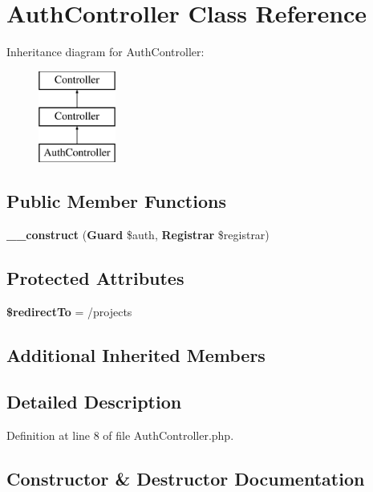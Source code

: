 \section{Auth\+Controller Class Reference}
\label{class_app_1_1_http_1_1_controllers_1_1_auth_1_1_auth_controller}
Inheritance diagram for Auth\+Controller\+:\begin{figure}[H]
\begin{center}
\leavevmode
\includegraphics[height=3.000000cm]{class_app_1_1_http_1_1_controllers_1_1_auth_1_1_auth_controller}
\end{center}
\end{figure}
\subsection*{Public Member Functions}
\begin{DoxyCompactItemize}
\item 
{\bf \+\_\+\+\_\+construct} ({\bf Guard} \$auth, {\bf Registrar} \$registrar)
\end{DoxyCompactItemize}
\subsection*{Protected Attributes}
\begin{DoxyCompactItemize}
\item 
{\bf \$redirect\+To} = \textquotesingle{}/projects\textquotesingle{}
\end{DoxyCompactItemize}
\subsection*{Additional Inherited Members}


\subsection{Detailed Description}


Definition at line 8 of file Auth\+Controller.\+php.



\subsection{Constructor \& Destructor Documentation}
